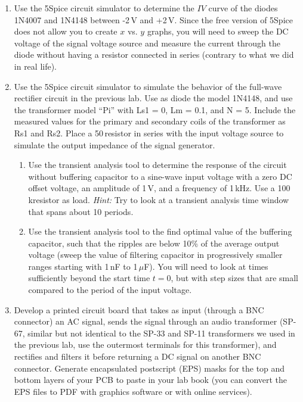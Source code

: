 \documentclass{article}
\begin{document}
\begin{enumerate}
\item Use the 5Spice circuit simulator to determine the $IV$ curve of the diodes 1N4007 and 1N4148 between -2\,V and +2\,V.  Since the free version of 5Spice does not allow you to create $x$ vs. $y$ graphs, you will need to sweep the DC voltage of the signal voltage source and measure the current through the diode without having a resistor connected in series (contrary to what we did in real life).

\item Use the 5Spice circuit simulator to simulate the behavior of the full-wave rectifier circuit in the previous lab.  Use as diode the model 1N4148, and use the transformer model ``Pi'' with Ls1 = 0, Lm = 0.1, and N = 5.  Include the measured values for the primary and secondary coils of the transformer as Rs1 and Rs2.  Place a 50\,\Ohm resistor in series with the input voltage source to simulate the output impedance of the signal generator.
\begin{enumerate}
\item Use the transient analysis tool to determine the response of the circuit without buffering capacitor to a sine-wave input voltage with a zero DC offset voltage, an amplitude of 1\,V, and a frequency of 1\,kHz.  Use a 100\,k\Ohm resistor as load.  \emph{Hint:} Try to look at a transient analysis time window that spans about 10 periods.
\item Use the transient analysis tool to the find optimal value of the buffering capacitor, such that the ripples are below 10\% of the average output voltage (sweep the value of filtering capacitor in progressively smaller ranges starting with 1\,nF to 1\,$\mu$F).  You will need to look at times sufficiently beyond the start time $t = 0$, but with step sizes that are small compared to the period of the input voltage.
\end{enumerate}

\item Develop a printed circuit board that takes as input (through a BNC connector) an AC signal, sends the signal through an audio transformer (SP-67, similar but not identical to the SP-33 and SP-11 transformers we used in the previous lab, use the outermost terminals for this transformer), and rectifies and filters it before returning a DC signal on another BNC connector.  Generate encapsulated postscript (EPS) masks for the top and bottom layers of your PCB to paste in your lab book (you can convert the EPS files to PDF with graphics software or with online services).
\end{enumerate}
\end{document}
